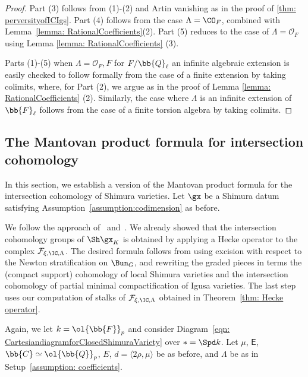 \documentclass[letterpaper,11pt]{amsart}
\begin{document}
\begin{proof}
Part (3) follows from (1)-(2) and Artin vanishing as in the proof of \ref{thm: perversityofICIgs}. Part (4) follows from the case $\Lambda=\CO_F$, combined with Lemma~\ref{lemma: RationalCoefficients}(2). Part (5) reduces to the case of $\Lambda = \mathcal{O}_{F}$ using Lemma \ref{lemma: RationalCoefficients} (3). 

Parts (1)-(5) when $\Lambda = \mathcal{O}_{F},F$ for $F/\bb{Q}_{\ell}$ an infinite algebraic extension is easily checked to follow formally from the case of a finite extension by taking colimits, where, for Part (2), we argue as in the proof of Lemma \ref{lemma: RationalCoefficients} (2). Similarly, the case where $\Lambda$ is an infinite extension of $\bb{F}_{\ell}$ follows from the case of a finite torsion algebra by taking colimits. 
\end{proof}

\subsection{The Mantovan product formula for intersection cohomology}

In this section, we establish a version of the Mantovan product formula for the intersection cohomology of Shimura varieties. Let $\gx$ be a Shimura datum satisfying Assumption~\ref{assumption:codimension} as before.

We follow the approach of~\cite[Corollary~3.22]{HamannLeeTorsion} and~\cite[Theorem 8.5.7]{DvHKZ}. We already showed that the intersection cohomology groups of $\Sh\gx_K$ is obtained by applying a Hecke operator to the complex $\mathcal{F}_{\xi,\IC,\Lambda}$. The desired formula follows from using excision with respect to the Newton stratification on $\Bun_G$, and rewriting the graded pieces in terms the (compact support) cohomology of local Shimura varieties and the intersection cohomology of partial minimal compactification of Igusa varieties. The last step uses our computation of stalks of $\mathcal{F}_{\xi,\IC,\Lambda}$ obtained in Theorem~\ref{thm: Hecke operator}.

Again, we let $k=\ol{\bb{F}}_p$ and consider Diagram~\eqref{eqn: CartesiandiagramforClosedShimuraVariety} over $\ast=\Spd k$. Let $\mu$, $\mathsf{E}$, $\bb{C}\simeq \ol{\bb{Q}}_p$, $E$, $d=\langle2\rho, \mu\rangle$ be as before, and $\Lambda$ be as in Setup~\ref{assumption: coefficients}.
\end{document}
